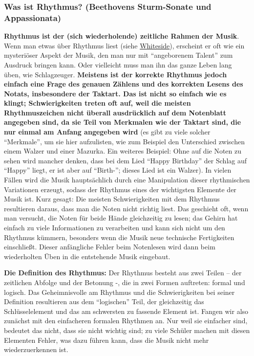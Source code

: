 \subsubsection{Was ist Rhythmus? (Beethovens Sturm-Sonate und Appassionata)}
\label{c1iii1b}

\textbf{Rhythmus ist der (sich wiederholende) zeitliche Rahmen der Musik}.
Wenn man etwas über Rhythmus liest (siehe \hyperref[Whiteside]{Whiteside}), erscheint er oft wie ein mysteriöser Aspekt der Musik, den man nur mit \enquote{angeborenem Talent} zum Ausdruck bringen kann.
Oder vielleicht muss man ihn das ganze Leben lang üben, wie Schlagzeuger.
\textbf{Meistens ist der korrekte Rhythmus jedoch einfach eine Frage des genauen Zählens und des korrekten Lesens des Notats, insbesondere der Taktart.
Das ist nicht so einfach wie es klingt; Schwierigkeiten treten oft auf, weil die meisten Rhythmuszeichen nicht überall ausdrücklich auf dem Notenblatt angegeben sind, da sie Teil von Merkmalen wie der Taktart sind, die nur einmal am Anfang angegeben wird} (es gibt zu viele solcher \enquote{Merkmale}, um sie hier aufzulisten, wie zum Beispiel den Unterschied zwischen einem Walzer und einer Mazurka.
Ein weiteres Beispiel: Ohne auf die Noten zu sehen wird mancher denken, dass bei dem Lied \enquote{Happy Birthday} der Schlag auf \enquote{Happy} liegt, er ist aber auf \enquote{Birth-}; dieses Lied ist ein Walzer).
In vielen Fällen wird die Musik hauptsächlich durch eine Manipulation dieser rhythmischen Variationen erzeugt, sodass der Rhythmus eines der wichtigsten Elemente der Musik ist.
Kurz gesagt: Die meisten Schwierigkeiten mit dem Rhythmus resultieren daraus, dass man die Noten nicht richtig liest.
Das geschieht oft, wenn man versucht, die Noten für beide Hände gleichzeitig zu lesen; das Gehirn hat einfach zu viele Informationen zu verarbeiten und kann sich nicht um den Rhythmus kümmern, besonders wenn die Musik neue technische Fertigkeiten einschließt.
Dieser anfängliche Fehler beim Notenlesen wird dann beim wiederholten Üben in die entstehende Musik eingebaut.

\textbf{Die Definition des Rhythmus:}
Der Rhythmus besteht aus zwei Teilen -- der zeitlichen Abfolge und der Betonung -, die in zwei Formen auftreten: formal und logisch.
Das Geheimnisvolle am Rhythmus und die Schwierigkeiten bei seiner Definition resultieren aus dem \enquote{logischen} Teil, der gleichzeitig das Schlüsselelement und das am schwersten zu fassende Element ist.
Fangen wir also zunächst mit den einfacheren formalen Rhythmen an.
Nur weil sie einfacher sind, bedeutet das nicht, dass sie nicht wichtig sind; zu viele Schüler machen mit diesen Elementen Fehler, was dazu führen kann, dass die Musik nicht mehr wiederzuerkennen ist.

